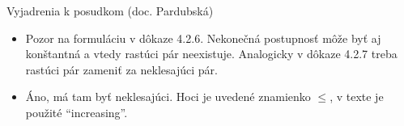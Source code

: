 \begin{frame}[t]{Vyjadrenia k posudkom (doc. Pardubská)}
  \begin{itemize}
    \item Pozor na formuláciu v dôkaze 4.2.6. Nekonečná postupnosť môže byť aj konštantná a vtedy rastúci pár neexistuje. Analogicky v dôkaze 4.2.7 treba rastúci pár zameniť za neklesajúci pár.
    \pause
    \item Áno, má tam byť neklesajúci. Hoci je uvedené znamienko $\leq$, v texte je použité ``increasing''.
  \end{itemize}
\end{frame}

